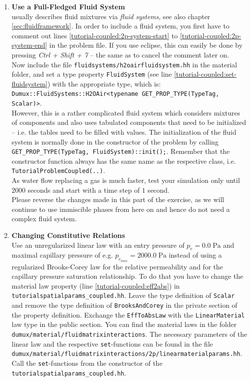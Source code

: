 \begin{enumerate}
\item \textbf{Use a Full-Fledged Fluid System} \\
\Dumux usually describes fluid mixtures via \textit{fluid systems}, see also chapter \ref{sec:fluidframework}. 
In order to include a fluid system, you first have to comment out lines \ref{tutorial-coupled:2p-system-start} 
to \ref{tutorial-coupled:2p-system-end} in the problem file. If you use eclipse, this can easily be done by pressing \textit{Ctrl + Shift + 7} -- 
the same as to cancel the comment later on.\\
Now include the file \texttt{fluidsystems/h2oairfluidsystem.hh} in the material folder, and set a type property \texttt{FluidSystem} (see line \ref{tutorial-coupled:set-fluidsystem})
with the appropriate type, which is:\\
\texttt{Dumux::FluidSystems::H2OAir<typename GET\_PROP\_TYPE(TypeTag, Scalar)>}.\\
However, this is a rather complicated fluid system which 
considers mixtures of components and also uses tabulated components that need to be initialized -- i.e. the tables need to be filled with values. 
The initialization of the fluid system is normally done in the constructor of the problem by calling \texttt{GET\_PROP\_TYPE(TypeTag, FluidSystem)::init();}. 
Remember that the constructor function always has the same name as the respective class, i.e. \texttt{TutorialProblemCoupled(..)}.\\
As water flow replacing a gas is much faster, test your simulation only until $2000$ seconds and start with a time step of $1$ second.\\
Please reverse the changes made in this part of the exercise, as we will continue to use immiscible phases from here on and hence do not need a complex fluid system.

\item \textbf{Changing Constitutive Relations} \\
  Use an unregularized linear law with an entry pressure of $p_e = 0.0\;\text{Pa}$ and maximal capillary pressure of e.g. $p_{c_{max}} = 2000.0\;\text{Pa}$ instead of using a
 regularized Brooks-Corey law for the
  relative permeability and for the capillary pressure saturation relationship. To do that you have
  to change the material law property (line \ref{tutorial-coupled:eff2abs}) in \texttt{tutorialspatialparams\_coupled.hh}. Leave the type definition of \texttt{Scalar} and remove
 the type definition of \texttt{BrooksAndCorey} in the private section of the property definition. Exchange the \texttt{EffToAbsLaw} with the \texttt{LinearMaterial} law type in the 
public section.
 You can find the material laws in the folder 
  \verb+dumux/material/fluidmatrixinteractions+. The necessary parameters
of the linear law and the respective \texttt{set}-functions can be found
 in the file \\
 \verb+dumux/material/fluidmatrixinteractions/2p/linearmaterialparams.hh+.\\
Call the \texttt{set}-functions from the constructor of the \texttt{tutorialspatialparams\_coupled.hh}.
 

\end{enumerate}
